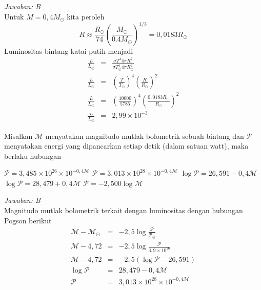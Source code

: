 \documentclass[11pt,fleqn, a4paper]{exam}
\begin{document}
\begin{questions}
\textit{Jawaban: B}\\
Untuk $M = 0,4 M_{\odot}$ kita peroleh
\begin{equation*}
R \approx \frac{R_{\odot}}{74} \left( \frac{M_{\odot}}{0.4 M_{\odot}} \right)^{1/3} = 0,0183 R_{\odot}
\end{equation*}
Luminositas bintang katai putih menjadi
\begin{eqnarray*}
\frac{L}{L_{\odot}} &=& \frac{\sigma T^4 4 \pi R^2}{\sigma T_{\odot}^4 4 \pi R_{\odot}^2}\\
\frac{L}{L_{\odot}} &=& \left( \frac{T}{T_{\odot}}\right)^{4} \left( \frac{R}{R_{\odot}} \right)^2\\
\frac{L}{L_{\odot}} &=& \left(\frac{10000}{5785}\right)^{4} \left( \frac{0,0183 R_{\odot}}{R_{\odot}} \right)^2\\
\frac{L}{L_{\odot}} &=& 2,99 \times 10^{-3}
\end{eqnarray*}


\vspace{0.5cm}
\question Misalkan $\mathcal{M}$ menyatakan magnitudo mutlak bolometrik sebuah bintang dan $\mathcal{P}$ menyatakan energi yang dipancarkan setiap detik (dalam satuan watt), maka berlaku hubungan
\begin{choices}
\choice $\mathcal{P} = 3,485 \times 10^{26} \times 10^{-0,4 \mathcal{M}}$
\choice $\mathcal{P} = 3,013 \times 10^{28} \times 10^{-0,4 \mathcal{M}}$
\choice $\log{\mathcal{P}} = 26,591 - 0,4 \mathcal{M}$
\choice $\log{\mathcal{P}} = 28,479 + 0,4 \mathcal{M}$
\choice $\mathcal{P} = -2,500 \log{\mathcal{M}}$
\end{choices}

\textit{Jawaban: B}\\
Magnitudo mutlak bolometrik terkait dengan luminositas dengan hubungan Pogson berikut
\begin{eqnarray*}
\mathcal{M} - \mathcal{M}_{\odot} &=& -2,5 \log{\frac{\mathcal{P}}{\mathcal{P}_{\odot}}}\\
\mathcal{M} - 4,72 &=& -2,5 \log{\frac{\mathcal{P}}{3,9 \times 10^{26}}}\\
\mathcal{M} - 4,72 &=& -2,5 \left( \log{\mathcal{P}} - 26,591 \right)\\
\log{\mathcal{P}} &=& 28,479 - 0,4 \mathcal{M}\\
\mathcal{P} &=& 3,013 \times 10^{28} \times 10^{-0,4 \mathcal{M}}
\end{eqnarray*}


\end{questions}
\end{document}
